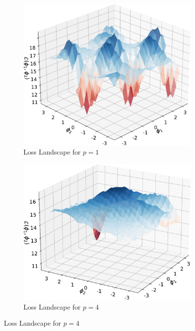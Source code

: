 \begin{figure}[htp]
    \centering
    \begin{subfigure}[b]{0.32\linewidth}
        \includegraphics[width=\textwidth]{figures/qleet/loss_landscape_p1.pdf}
        \caption{Loss Landscape for $p=1$\label{fig:loss-p1}}
    \end{subfigure}
    \begin{subfigure}[b]{0.32\linewidth}
        \includegraphics[width=\textwidth]{figures/qleet/loss_landscape_p2.pdf}
        \caption{Loss Landscape for $p=4$\label{fig:loss-p4}}

\end{subfigure}
\end{figure}

